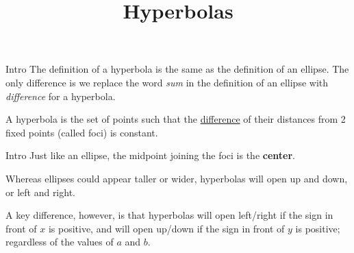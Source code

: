 \documentclass[t,usenames,dvipsnames]{beamer}
\title{Hyperbolas}
\author{}
\date{}
\begin{document}
\begin{frame}
    \titlepage
\end{frame}

\begin{frame}{Intro}
The definition of a hyperbola is the same as the definition of an ellipse. The only difference is we replace the word \emph{sum} in the definition of an ellipse with \emph{difference} for a hyperbola.  \newline\\  \pause

A \alert{hyperbola} is the set of points such that the \underline{difference} of their distances from 2 fixed points (called \alert{foci}) is constant.
\end{frame}

\begin{frame}{Intro}
Just like an ellipse, the midpoint joining the foci is the \textbf{center}.    \newline\\   \pause

Whereas ellipses could appear taller or wider, hyperbolas will open up and down, or left and right. \newline\\  \pause

A key difference, however, is that hyperbolas will open left/right if the sign in front of $x$ is positive, and will open up/down if the sign in front of $y$ is positive; regardless of the values of $a$ and $b$.  
\end{frame}
\end{document}
